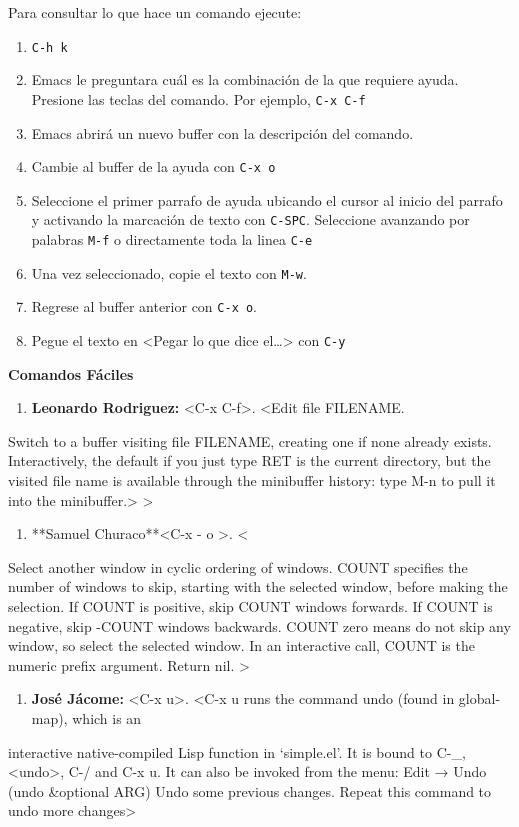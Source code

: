 \documentclass{article}
\begin{document}
\begin{center}
Para consultar lo que hace un comando ejecute:
\begin{enumerate}
\item \texttt{C-h k}
\item Emacs le preguntara cuál es la combinación de la que requiere
ayuda. Presione las teclas del comando. Por ejemplo, \texttt{C-x C-f}
\item Emacs abrirá un nuevo buffer con la descripción del comando.
\item Cambie al buffer de la ayuda con \texttt{C-x o}
\item Seleccione el primer parrafo de ayuda ubicando el cursor al inicio
del parrafo y activando la marcación de texto con
\texttt{C-SPC}. Seleccione avanzando por palabras \texttt{M-f} o directamente
toda la linea \texttt{C-e}
\item Una vez seleccionado, copie el texto con \texttt{M-w}.
\item Regrese al buffer anterior con \texttt{C-x o}.
\item Pegue el texto en <Pegar lo que dice el\ldots{}> con \texttt{C-y}
\end{enumerate}

\textbf{\textbf{Comandos Fáciles}}
\begin{enumerate}
\item \textbf{\textbf{Leonardo Rodriguez:}} <C-x C-f>. <Edit file FILENAME.
\end{enumerate}
Switch to a buffer visiting file FILENAME, creating one if none
already exists.
Interactively, the default if you just type RET is the current directory,
but the visited file name is available through the minibuffer history:
type M-n to pull it into the minibuffer.>
>
\begin{enumerate}
\item **Samuel Churaco**<C-x - o >. <
\end{enumerate}
Select another window in cyclic ordering of windows.
COUNT specifies the number of windows to skip, starting with the
selected window, before making the selection.  If COUNT is
positive, skip COUNT windows forwards.  If COUNT is negative,
skip -COUNT windows backwards.  COUNT zero means do not skip any
window, so select the selected window.  In an interactive call,
COUNT is the numeric prefix argument.  Return nil.
 >
\begin{enumerate}
\item \textbf{\textbf{José Jácome:}} <C-x u>. <C-x u runs the command undo (found in global-map), which is an
\end{enumerate}
interactive native-compiled Lisp function in ‘simple.el’.
It is bound to C-\_, <undo>, C-/ and C-x u.
It can also be invoked from the menu: Edit → Undo
(undo \&optional ARG)
Undo some previous changes.
Repeat this command to undo more changes>


\end{center}
\end{document}
